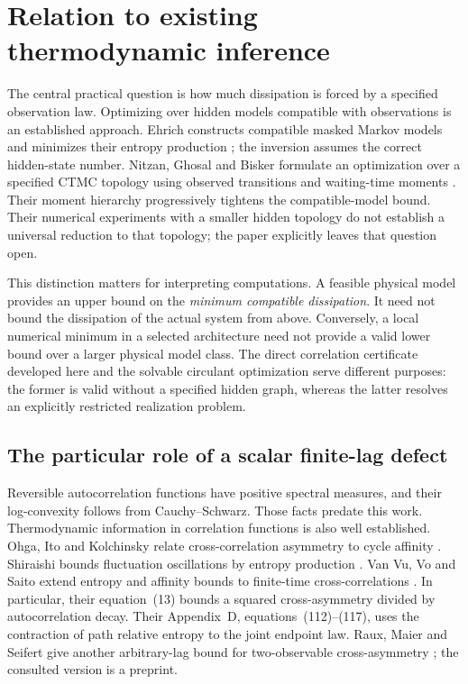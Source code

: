 \section{Relation to existing thermodynamic inference}
\label{sec:pa-prior-art}

The central practical question is how much dissipation is forced by a specified
observation law. Optimizing over hidden models compatible with observations is
an established approach. Ehrich constructs compatible masked Markov models and
minimizes their entropy production \cite{ciEhrich2021}; the inversion assumes
the correct hidden-state number. Nitzan, Ghosal and Bisker formulate an
optimization over a specified CTMC topology using observed transitions and
waiting-time moments \cite{ciNitzan2023}. Their moment hierarchy progressively
tightens the compatible-model bound. Their numerical experiments with a
smaller hidden topology do not establish a universal reduction to that topology;
the paper explicitly leaves that question open.

This distinction matters for interpreting computations. A feasible physical
model provides an upper bound on the \emph{minimum compatible dissipation}.
It need not bound the dissipation of the actual system from above. Conversely,
a local numerical minimum in a selected architecture need not provide a
valid lower bound over a larger physical model class. The direct correlation
certificate developed here and the solvable circulant optimization serve
different purposes: the former is valid without a specified hidden graph,
whereas the latter resolves an explicitly restricted realization problem.

\subsection{The particular role of a scalar finite-lag defect}

Reversible autocorrelation functions have positive spectral measures, and their
log-convexity follows from Cauchy--Schwarz. Those facts predate this work.
Thermodynamic information in correlation functions is also well established.
Ohga, Ito and Kolchinsky relate cross-correlation asymmetry to cycle affinity
\cite{rfOhga2023}. Shiraishi bounds fluctuation oscillations by entropy
production \cite{rfShiraishi2023}. Van Vu, Vo and Saito extend entropy and
affinity bounds to finite-time cross-correlations \cite{paVu2024}.
In particular, their equation~(13) bounds a squared cross-asymmetry divided by
autocorrelation decay. Their Appendix~D, equations~(112)--(117), uses the
contraction of path relative entropy to the joint endpoint law. Raux, Maier
and Seifert give another arbitrary-lag bound for two-observable
cross-asymmetry \cite{rfRaux2026}; the consulted version is a preprint.

